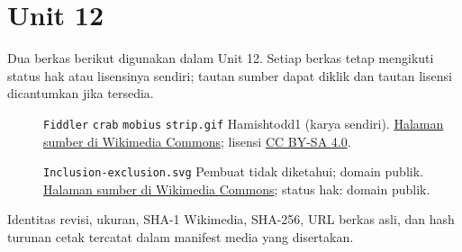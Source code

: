 \section*{Unit 12}
Dua berkas berikut digunakan dalam Unit 12. Setiap berkas tetap mengikuti status hak atau lisensinya sendiri; tautan sumber dapat diklik dan tautan lisensi dicantumkan jika tersedia.
\begin{description}
\item[]\texttt{Fiddler} \texttt{crab} \texttt{mobius} \texttt{strip.gif}
Hamishtodd1 (karya sendiri).
\href{https://commons.wikimedia.org/wiki/File:Fiddler_crab_mobius_strip.gif}{Halaman sumber di Wikimedia Commons}; lisensi \href{https://creativecommons.org/licenses/by-sa/4.0/}{CC BY-SA 4.0}.
\item[]\texttt{Inclusion-exclusion.svg}
Pembuat tidak diketahui; domain publik.
\href{https://commons.wikimedia.org/wiki/File:Inclusion-exclusion.svg}{Halaman sumber di Wikimedia Commons}; status hak: domain publik.
\end{description}
Identitas revisi, ukuran, SHA-1 Wikimedia, SHA-256, URL berkas asli, dan hash turunan cetak tercatat dalam manifest media yang disertakan.
